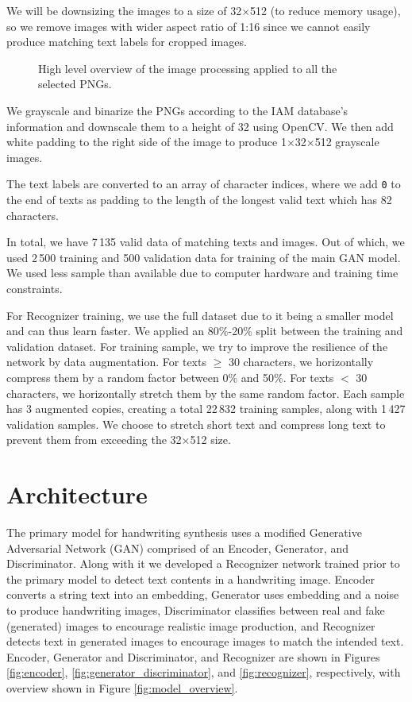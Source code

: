 \documentclass{article} %
\begin{document}
We will be downsizing the images to a size of 32$\times$512 (to reduce memory usage), so we remove images with wider aspect ratio of 1:16 since we cannot easily produce matching text labels for cropped images.

\begin{figure}[!hbpt]
    \begin{center}
        
    \end{center}
    \caption{High level overview of the image processing applied to all the selected PNGs.}
    \label{fig:image_processing}
\end{figure}

We grayscale and binarize the PNGs according to the IAM database's information and downscale them to a height of 32 using OpenCV. We then add white padding to the right side of the image to produce 1$\times$32$\times$512 grayscale images.

The text labels are converted to an array of character indices, where we add \texttt{0} to the end of texts as padding to the length of the longest valid text which has 82 characters.

In total, we have 7\,135 valid data of matching texts and images. Out of which, we used 2\,500 training and 500 validation data for training of the main GAN model. We used less sample than available due to computer hardware and training time constraints.

For Recognizer training, we use the full dataset due to it being a smaller model and can thus learn faster. We applied an 80\%-20\% split between the training and validation dataset. For training sample, we try to improve the resilience of the network by data augmentation. For texts $\geq$ 30 characters, we horizontally compress them by a random factor between 0\% and 50\%. For texts $<$ 30 characters, we horizontally stretch them by the same random factor. Each sample has 3 augmented copies, creating a total 22\,832 training samples, along with 1\,427 validation samples. We choose to stretch short text and compress long text to prevent them from exceeding the 32$\times$512 size.

\section{Architecture}

The primary model for handwriting synthesis uses a modified Generative Adversarial Network (GAN) comprised of an Encoder, Generator, and Discriminator. Along with it we developed a Recognizer network trained prior to the primary model to detect text contents in a handwriting image. Encoder converts a string text into an embedding, Generator uses embedding and a noise to produce handwriting images, Discriminator classifies between real and fake (generated) images to encourage realistic image production, and Recognizer detects text in generated images to encourage images to match the intended text. Encoder, Generator and Discriminator, and Recognizer are shown in Figures \ref{fig:encoder}, \ref{fig:generator_discriminator}, and \ref{fig:recognizer}, respectively, with overview shown in Figure \ref{fig:model_overview}.
\end{document}
